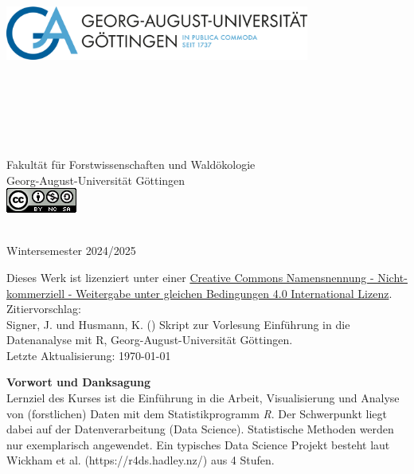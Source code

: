 \begin{titlepage}
\begin{center}
\vfill
\includegraphics[width=10cm,height=8cm]{misc/fig/logo-uni-neu.png}
~\\[0.4cm]

Fakultät für Forstwissenschaften und Waldökologie \\
Georg-August-Universität Göttingen \\[1.2cm]
\includegraphics{misc/fig/logo_cc.png}
\vfill

\hRule ~\\[0.5cm]
{\large Wintersemester 2024/2025}\\


\end{center}
\newpage
\vspace*{\fill}
Dieses Werk ist lizenziert unter einer \href{https://creativecommons.org/licenses/by-nc-sa/4.0/}{Creative Commons Namensnennung - Nicht-kommerziell - Weitergabe unter gleichen Bedingungen 4.0 International Lizenz}. \\[1cm]
Zitiervorschlag: \\
Signer, J. und Husmann, K. (\the\year{}) Skript zur Vorlesung Einführung in die Datenanalyse mit R, Georg-August-Universität Göttingen.
~\\[1cm]
Letzte Aktualisierung: \today

\newpage

{\bf Vorwort und Danksagung} \\[0.5cm]

Lernziel des Kurses ist die Einführung in die Arbeit, Visualisierung und Analyse von (forstlichen) Daten mit dem Statistikprogramm \textit{R}. Der Schwerpunkt liegt dabei auf der Datenverarbeitung (Data Science). Statistische Methoden werden nur exemplarisch angewendet. Ein typisches Data Science Projekt besteht laut Wickham et al. (https://r4ds.hadley.nz/) aus 4 Stufen.


\end{titlepage}
